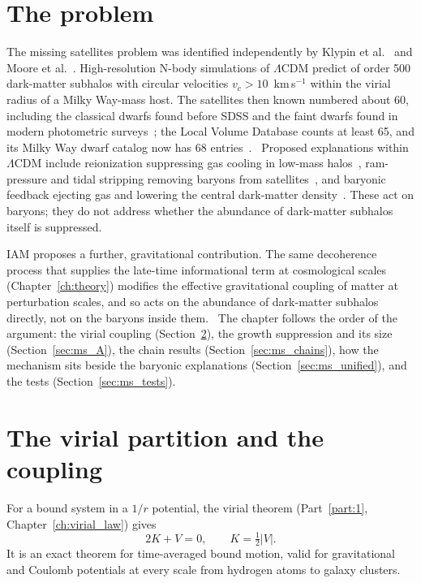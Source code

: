 \section{The problem}\label{sec:ms_problem}
The missing satellites problem was identified independently by Klypin et al.~\cite{Klypin1999} and Moore et al.~\cite{Moore1999}. High-resolution
N-body simulations of $\Lambda$CDM predict of order 500 dark-matter subhalos with circular velocities $v_c>10$~km\,s$^{-1}$ within the virial radius of
a Milky Way-mass host. The satellites then known numbered about 60, including the classical dwarfs found before SDSS and the faint
dwarfs found in modern photometric surveys~\cite{Koposov2008,Tollerud2008}; the Local Volume Database counts at least 65, and its Milky Way dwarf catalog now has 68 entries~\cite{Pace2025LVDB}. \observed\
Proposed explanations within $\Lambda$CDM include reionization suppressing gas cooling in low-mass halos~\cite{Bullock2000,Benson2002b}, ram-pressure
and tidal stripping removing baryons from satellites~\cite{Mayer2006}, and baryonic feedback ejecting gas and lowering the central dark-matter
density~\cite{ReadGilmore2005,PontzenGovernato2012}. These act on baryons; they do not address whether the abundance of dark-matter subhalos itself is suppressed.

IAM proposes a further, gravitational contribution. The same decoherence process that supplies the late-time informational term at cosmological
scales (Chapter~\ref{ch:theory}) modifies the effective gravitational coupling of matter at perturbation scales, and so acts on the abundance of dark-matter
subhalos directly, not on the baryons inside them. \conjecture\ The chapter follows the order of the argument: the virial coupling
(Section~\ref{sec:ms_closure}), the growth suppression and its size (Section~\ref{sec:ms_A}), the chain results (Section~\ref{sec:ms_chains}), how the
mechanism sits beside the baryonic explanations (Section~\ref{sec:ms_unified}), and the tests (Section~\ref{sec:ms_tests}).

\section{The virial partition and the coupling}\label{sec:ms_closure}
For a bound system in a $1/r$ potential, the virial theorem (Part~\ref{part:1}, Chapter~\ref{ch:virial_law}) gives
\begin{equation}
2K+V=0,\qquad K=\tfrac12|V|.
\label{eq:ms_virial}\end{equation}
It is an exact theorem for time-averaged bound motion, valid for gravitational and Coulomb potentials at every scale from hydrogen atoms to galaxy
clusters. \derived

